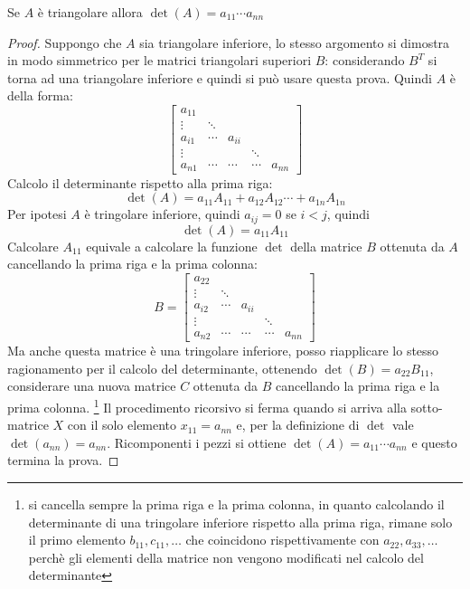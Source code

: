 \begin{exercise}
Se $A$ \`e triangolare allora $\det(A) = a_{11} \cdots a_{nn}$
\end{exercise}
\begin{proof}
Suppongo che $A$ sia triangolare inferiore, lo stesso argomento si dimostra in
modo simmetrico per le matrici triangolari superiori $B$: considerando $B^{T}$
si torna ad una triangolare inferiore e quindi si pu\`o usare questa prova.
Quindi $A$ \`e della forma:
\begin{displaymath}
\begin{bmatrix}
a_{11} \\
\vdots & \ddots \\
a_{i1} & \cdots & a_{ii} \\
\vdots & 		&		& \ddots\\
a_{n1} & \cdots & \cdots &\cdots & a_{nn}
\end{bmatrix}
\end{displaymath}
Calcolo il determinante rispetto alla prima riga:
\begin{displaymath}
\det(A) = a_{11}A_{11} + a_{12}A_{12}\cdots + a_{1n}A_{1n}
\end{displaymath}
Per ipotesi $A$ \`e tringolare inferiore, quindi $a_{ij} = 0$ se $i < j$, quindi
\begin{displaymath}
\det(A) = a_{11}A_{11}
\end{displaymath}
Calcolare $A_{11}$ equivale a calcolare la funzione $\det$ della matrice
$B$ ottenuta da $A$ cancellando la prima riga e la prima colonna:
\begin{displaymath}
B = \begin{bmatrix}
a_{22} \\
\vdots & \ddots \\
a_{i2} & \cdots & a_{ii} \\
\vdots & 		&		& \ddots\\
a_{n2} & \cdots & \cdots &\cdots & a_{nn}
\end{bmatrix}
\end{displaymath}
Ma anche questa matrice \`e una tringolare inferiore, posso riapplicare lo
stesso ragionamento per il calcolo del determinante, ottenendo $\det(B) =
a_{22}B_{11}$, considerare una nuova matrice $C$ ottenuta da $B$ cancellando la
prima riga e la prima colonna. \footnote{si cancella sempre la prima riga e la
prima colonna, in quanto calcolando il determinante di una tringolare inferiore
rispetto alla prima riga, rimane solo il primo elemento $b_{11}, c_{11}, \ldots$
che coincidono rispettivamente con $a_{22}, a_{33}, \ldots$ perch\`e gli
elementi della matrice non vengono modificati nel calcolo del determinante}
Il procedimento ricorsivo si ferma quando si arriva alla sotto-matrice $X$ con
il solo elemento $x_{11} = a_{nn}$ e, per la definizione di $\det$ vale
$\det(a_{nn}) = a_{nn}$. Ricomponenti i pezzi si ottiene $\det(A) = a_{11}
\cdots a_{nn}$ e questo termina la prova.
\end{proof}

